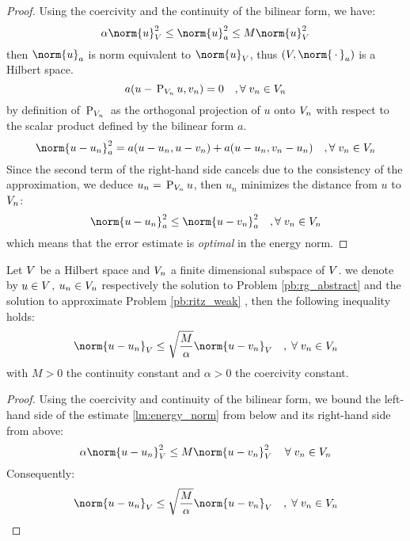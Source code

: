 \begin{proof}
Using the coercivity and the continuity of the bilinear form, we have:
\begin{equation*}
\alpha \norm{u}_\xV^2 \leq \norm{u}^2_a \leq M \norm{u}^2_\xV
\end{equation*}
then $\norm{u}_a$ is norm equivalent to $\norm{u}_\xV$, thus $(\xV,\norm{\xDot}_a)$ is a Hilbert space.
\begin{equation*}
a( u - \,\mathrm{P}_{{V}_n}\, u, v_n ) = 0\quad,{\forall\;}  v_n \in {V}_n
\end{equation*}
by definition of $\,\mathrm{P}_{{V}_n}\,$ as the orthogonal projection of $u$ onto ${V}_n$ with respect to the scalar product defined by the bilinear form $a$.
\begin{equation*}
\norm{u - u_n}_a^2 = a(u-u_n, u - v_n) + a(u - u_n, v_n - u_n)\quad,\forany  v_n \in \xV_n
\end{equation*}
Since the second term of the right-hand side cancels due to the consistency of the approximation, we deduce $u_n = \,\mathrm{P}_{{V}_n}\, u$, then $u_n$ minimizes the distance from $u$ to ${V}_n$:
\begin{equation*}
\norm{u - u_n}_a^2 \leq \norm{u - v_n}_a^2\quad,\forany  v_n \in \xV_n
\end{equation*}
which means that the error estimate is \textit{optimal} in the energy norm.
\end{proof}

\begin{lmm}\label{lm:cea}
Let ${V}$ be a Hilbert space and ${V}_n$ a finite dimensional subspace of ${V}$.
we denote by $u \in {V}$, $u_n \in {V}_n$ respectively the solution to Problem \eqref{pb:rg_abstract} and the solution to approximate Problem \eqref{pb:ritz_weak}
, then the following inequality holds:
\begin{equation*}
\norm{u - u_n}_\xV  \leq \sqrt{\dfrac{M}{\alpha}} \norm{u - v_n}_\xV\quad,\; \forany v_n \in \xV_n
\end{equation*}
with $M > 0$ the continuity constant and $\alpha > 0$ the coercivity constant.
\end{lmm}
\begin{proof}
Using the coercivity and continuity of the bilinear form, we bound the left-hand side of the estimate \eqref{lm:energy_norm} from below and its right-hand side from above:
\begin{equation*}
\alpha \norm{u - u_n}_\xV^2 \leq M \norm{u - v_n}_\xV^2\quad \,\forany  v_n \in \xV_n
\end{equation*}
Consequently:
\begin{equation*}
\norm{u - u_n}_\xV \leq \sqrt{\dfrac{M}{\alpha}} \norm{u - v_n}_\xV\quad,\; \forany v_n \in \xV_n
\end{equation*}
\end{proof}

